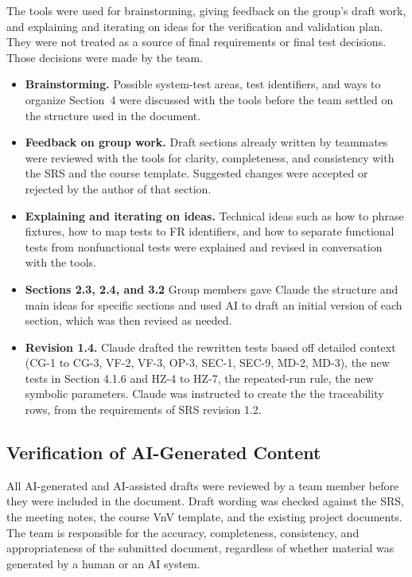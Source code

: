 \documentclass[12pt, titlepage]{article}
\begin{document}
The tools were used for brainstorming, giving feedback on the group's draft
work, and explaining and iterating on ideas for the verification and
validation plan. They were not treated as a source of final requirements or
final test decisions. Those decisions were made by the team.

\begin{itemize}
  \item \textbf{Brainstorming.} Possible system-test areas, test identifiers,
  and ways to organize Section~4 were discussed with the tools before the team
  settled on the structure used in the document.
  \item \textbf{Feedback on group work.} Draft sections already written by
  teammates were reviewed with the tools for clarity, completeness, and
  consistency with the SRS and the course template. Suggested changes were
  accepted or rejected by the author of that section.
  \item \textbf{Explaining and iterating on ideas.} Technical ideas such as
  how to phrase fixtures, how to map tests to FR identifiers, and how to
  separate functional tests from nonfunctional tests were explained and
  revised in conversation with the tools.
  \item \textbf{Sections 2.3, 2.4, and 3.2} Group members gave Claude the
  structure and main ideas for specific sections and used AI to draft an initial
  version of each section, which was then revised as needed.
  \item \textbf{Revision 1.4.} Claude drafted the rewritten tests based off detailed context
  (CG-1 to CG-3, VF-2, VF-3, OP-3, SEC-1, SEC-9, MD-2, MD-3), the new tests in
  Section 4.1.6 and HZ-4 to HZ-7, the repeated-run rule, the new symbolic
  parameters. Claude was instructed to create the the traceability rows, from the requirements of SRS
  revision 1.2.
\end{itemize}

\subsection{Verification of AI-Generated Content}

All AI-generated and AI-assisted drafts were reviewed by a team member before
they were included in the document. Draft wording was checked against the
SRS, the meeting notes, the course VnV template, and the existing project
documents. The team is responsible for the accuracy, completeness, consistency, and
appropriateness of the submitted document, regardless of whether material was
generated by a human or an AI system.
\end{document}
